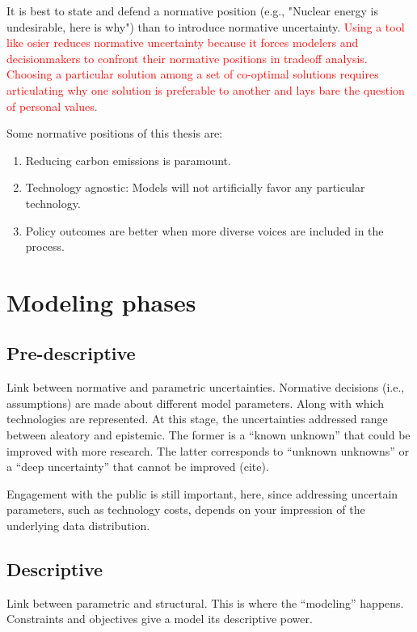 It is best to state and defend a normative position (e.g., "Nuclear energy is
undesirable, here is why") than to introduce normative uncertainty.
\textcolor{red}{Using a tool like \ac{osier} reduces normative uncertainty
because it forces modelers and decisionmakers to confront their normative
positions in tradeoff analysis. Choosing a particular solution among a set of
co-optimal solutions requires articulating why one solution is preferable to
another and lays bare the question of personal values.}

Some normative positions of this thesis are:
\begin{enumerate}
    \item Reducing carbon emissions is paramount.
    \item Technology agnostic: Models will not artificially favor any particular
    technology.
    \item Policy outcomes are better when more diverse voices are included in
    the process.
\end{enumerate}

\section{Modeling phases}
\label{section:modeling-phases}

\subsection{Pre-descriptive}

Link between normative and parametric uncertainties. Normative decisions (i.e.,
assumptions) are made about different model parameters. Along with which
technologies are represented. At this stage, the uncertainties addressed range
between aleatory and epistemic. The former is a ``known unknown'' that could be
improved with more research. The latter corresponds to ``unknown unknowns'' or a
``deep uncertainty'' that cannot be improved (cite).

Engagement with the public is still important, here, since addressing uncertain
parameters, such as technology costs, depends on your impression of the
underlying data distribution.


\subsection{Descriptive}
Link between parametric and structural. This is where the ``modeling'' happens.
Constraints and objectives give a model its descriptive power.

